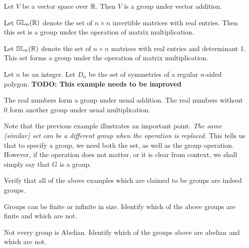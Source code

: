 \documentclass[./main.tex]{subfiles}
\begin{document}
\begin{example}
    Let $V$ be a vector space over $\mathbb{R}$. Then $V$ is a group under vector
    addition.
\end{example}

\begin{example}
    Let $\mathbb{GL}_n(\mathbb{R})$ denote the set of $n \times n$ invertible matrices
    with real entries. Then this set is a group under the operation of matrix
    multiplication.
\end{example}

\begin{example}
    Let $\mathbb{SL}_n(\mathbb{R})$ denote the set of $n \times n$ matrices with real
    entries and determinant 1. This set forms a group under the operation of
    matrix multiplication.
\end{example}

\begin{example}
    Let $n$ be an integer. Let $D_n$ be the set of symmetries of a regular
    $n$-sided polygon. \textbf{TODO: This example needs to be improved}
\end{example}

\begin{example}
    The real numbers form a group under usual addition. The real numbers without
    $0$ form another group under usual multiplication.
\end{example}

Note that the previous example illustrates an important point. \emph{The same
(similar) set can be a different group when the operation is replaced.} This
tells us that to specify a group, we need both the set, as well as the group
operation. However, if the operation does not matter, or it is clear from
context, we shall simply say that $G$ is a group.

\begin{exercise}
    Verify that all of the above examples which are claimed to be groups are
    indeed groups. 
\end{exercise}

\begin{exercise}
    Groups can be finite or infinite in size. Identify which of the above groups
    are finite and which are not.
\end{exercise}

\begin{exercise}
    Not every group is Abelian. Identify which of the groups above are abelian
    and which are not.
\end{exercise}
\end{document}
